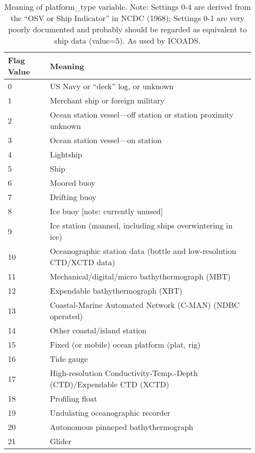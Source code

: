 \begin{table}[h]
\begin{center}
\caption{Meaning of platform\_type variable. Note: Settings 0-4 are derived from the “OSV or Ship Indicator” in NCDC (1968); Settings 0-1 are very poorly documented and probably should be regarded as equivalent to ship data (value=5). As used by ICOADS.}
\begin{tabular}{|l | l|} 
\hline
\bfseries Flag Value & \bfseries Meaning \\ 
\hline
0 & US Navy or “deck” log, or unknown\\ 
\hline
1 & Merchant ship or foreign military\\ 
\hline
2 & Ocean station vessel—off station or station proximity unknown\\ 
\hline
3 & Ocean station vessel—on station\\ 
\hline
4 & Lightship\\ 
\hline
5 & Ship\\ 
\hline
6 & Moored buoy\\ 
\hline
7 & Drifting buoy\\ 
\hline
8 & Ice buoy [note: currently unused]\\ 
\hline
9 & Ice station (manned, including ships overwintering in ice)\\ 
\hline
10 & Oceanographic station data (bottle and low-resolution CTD/XCTD data)\\ 
\hline
11 & Mechanical/digital/micro bathythermograph (MBT)\\ 
\hline
12 & Expendable bathythermograph (XBT)\\ 
\hline
13 & Coastal-Marine Automated Network (C-MAN) (NDBC operated)\\ 
\hline
14 & Other coastal/island station\\ 
\hline
15 & Fixed (or mobile) ocean platform (plat, rig)\\ 
\hline
16 & Tide gauge\\ 
\hline
17 & High-resolution Conductivity-Temp.-Depth (CTD)/Expendable CTD (XCTD)\\ 
\hline
18 & Profiling float\\ 
\hline
19 & Undulating oceanographic recorder\\ 
\hline
20 & Autonomous pinneped bathythermograph\\ 
\hline
21 & Glider\\ 
\hline
\end{tabular}
\end{center}
\end{table}
